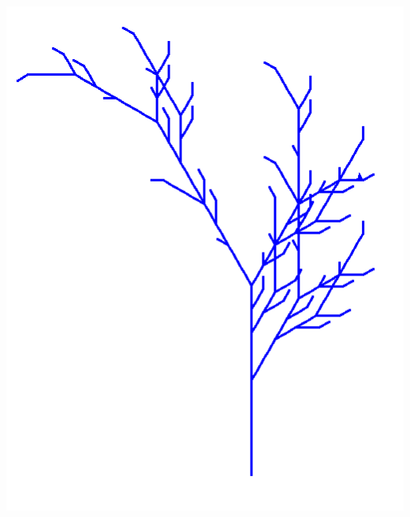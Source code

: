 \documentclass[11pt,class=report,crop=false]{standalone}
\begin{document}
\begin{activite}
\begin{enumerate}
\begin{center}
\includegraphics[scale=0.25]{ecran-lsysteme-12}
\end{center}
	
  
 \end{enumerate}


\end{activite}
\end{document}
